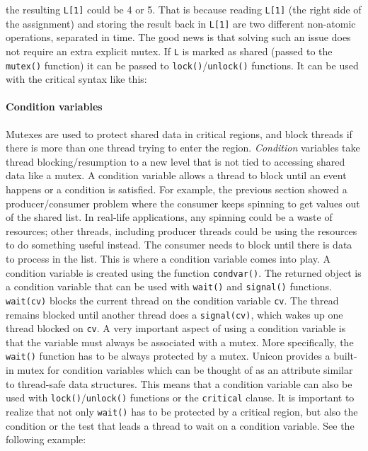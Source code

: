 
the resulting \texttt{L[1]} could be 4 or 5. That is because reading
\texttt{L[1]} (the right side of the assignment) and storing the result back in
\texttt{L[1]} are two different non-atomic operations, separated in time. The
good news is that solving such an issue does not require an extra explicit
mutex. If \texttt{L} is marked as shared (passed to the \texttt{mutex()}
function) it can be passed to \texttt{lock()}/\texttt{unlock()} functions. It
can be used with the critical syntax like this:


\paragraph{Condition variables}

Mutexes are used to protect shared data in critical regions, and block threads
if there is more than one thread trying to enter the region.  \emph{Condition}
variables take thread blocking/resumption to a new level that is not tied to
accessing shared data like a mutex. A condition variable allows a thread to
block until an event happens or a condition is satisfied. For example, the
previous section showed a producer/consumer problem where the consumer keeps
spinning to get values out of the shared list. In real-life applications, any
spinning could be a waste of resources; other threads, including producer
threads could be using the resources to do something useful instead. The
consumer needs to block until there is data to process in the list. This is
where a condition variable comes into play.  A condition variable is created
using the function \texttt{condvar()}. The returned object is a condition
variable that can be used with \texttt{wait()} and \texttt{signal()}
functions. \texttt{wait(cv)} blocks the current thread on the condition variable
\texttt{cv}. The thread remains blocked until another thread does a
\texttt{signal(cv)}, which wakes up one thread blocked on \texttt{cv}.  A very
important aspect of using a condition variable is that the variable must always
be associated with a mutex. More specifically, the \texttt{wait()} function has
to be always protected by a mutex.  Unicon provides a built-in mutex for
condition variables which can be thought of as an attribute similar to
thread-safe data structures. This means that a condition variable can also be
used with \texttt{lock()}/\texttt{unlock()} functions or the \texttt{critical} clause. It
is important to realize that not only \texttt{wait()} has to be protected by a
critical region, but also the condition or the test that leads a thread to wait
on a condition variable.  See the following example:

